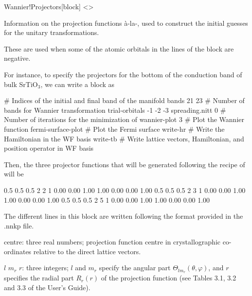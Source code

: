   \fi

  \begin{fdfentry}{Wannier!Projectors}[block]
  <>

  Information on the projection functions \`a-la-,
  used to construct the
  initial guesses for the unitary transformations.

  These are used when some of the atomic orbitals in the
   lines of the block  are negative.

   For instance, to specify the projectors for the bottom of the
   conduction band of bulk SrTiO$_{3}$, we can write a
   block  as

   \begin{fdfexample}
     # Indices of the initial and final band of the manifold
     bands  21  23
     # Number of bands for Wannier transformation
     trial-orbitals  -1 -2 -3
     spreading.nitt 0         # Number of iterations for the minimization of \Omega
     wannier-plot  3    # Plot the Wannier function
     fermi-surface-plot # Plot the Fermi surface
     write-hr           # Write the Hamiltonian in the WF basis
     write-tb           # Write lattice vectors, Hamiltonian, and position operator in WF basis
    \end{fdfexample}

   Then, the three projector functions that will be generated
   following the recipe of  will be

    \begin{fdfexample}
     0.5 0.5 0.5  2  2  1 0.00  0.00  1.00   1.00  0.00  0.00    1.00
     0.5 0.5 0.5  2  3  1 0.00  0.00  1.00   1.00  0.00  0.00    1.00
     0.5 0.5 0.5  2  5  1 0.00  0.00  1.00   1.00  0.00  0.00    1.00
    \end{fdfexample}

   The different lines in this block are written following the  format
   provided in the .nnkp file.

   centre: three real numbers; projection function centre in crystallographic
   co-ordinates relative to the direct lattice vectors.

   $l$ $m_{r}$ $r$: three integers; $l$ and $m_{r}$ specify the angular part
   $\Theta_{l m_{r}}(\theta,\varphi)$, and $r$ specifies the radial part
   $R_{r} (r)$ of the projection function (see Tables 3.1, 3.2 and 3.3
   of the  User's Guide).


\end{fdfentry}
